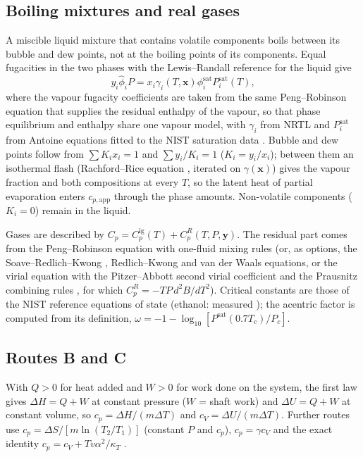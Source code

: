 \documentclass[journal=jceaax,manuscript=article,layout=twocolumn]{achemso}
\begin{document}
\subsection{Boiling mixtures and real gases}
A miscible liquid mixture that contains volatile components boils between its bubble and dew points, not at
the boiling points of its components. Equal fugacities in the two phases with the Lewis--Randall reference
for the liquid give
\begin{equation}
y_i\hat\phi_iP=x_i\gamma_i(T,\mathbf{x})\phi_i^\mathrm{sat}P_i^\mathrm{sat}(T),
\end{equation}
where the vapour fugacity coefficients are taken from the same Peng--Robinson equation that supplies the residual
enthalpy of the vapour, so that phase equilibrium and enthalpy share one vapour model,
with $\gamma_i$ from NRTL and $P_i^\mathrm{sat}$ from Antoine equations fitted to the NIST saturation
data \cite{NISTFluid}. Bubble and dew points follow from $\sum K_ix_i=1$ and $\sum y_i/K_i=1$
($K_i=y_i/x_i$); between them an isothermal flash (Rachford--Rice equation \cite{Rachford1952}, iterated on
$\gamma(\mathbf{x})$) gives the vapour fraction and both compositions at every $T$, so the latent heat of
partial evaporation enters $c_{p,\mathrm{app}}$ through the phase amounts. Non-volatile components
($K_i=0$) remain in the liquid.

Gases are described by $C_p=C_p^\mathrm{ig}(T)+C_p^R(T,P,\mathbf{y})$. The residual part comes from the
Peng--Robinson equation \cite{Peng1976} with one-fluid mixing rules (or, as options, the
Soave--Redlich--Kwong \cite{Soave1972}, Redlich--Kwong and van der Waals equations, or the virial equation
with the Pitzer--Abbott second virial coefficient and the Prausnitz combining rules \cite{Smith2018}, for which
$C_p^R=-TP\,d^2B/dT^2$). Critical constants are those of the NIST reference equations of state (ethanol:
measured \cite{He2018}); the acentric factor is computed from its definition,
$\omega=-1-\log_{10}[P^\mathrm{sat}(0.7T_c)/P_c]$.

\subsection{Routes B and C}
With $Q>0$ for heat added and $W>0$ for work done on the system, the first law gives $\Delta H = Q + W$ at
constant pressure ($W$ = shaft work) and $\Delta U = Q + W$ at constant volume, so
$c_p=\Delta H/(m\Delta T)$ and $c_V=\Delta U/(m\Delta T)$. Further routes use $c_p=\Delta S/[m\ln(T_2/T_1)]$ (constant
$P$ and $c_p$), $c_p=\gamma c_V$ and the exact identity $c_p=c_V+Tv\alpha^2/\kappa_T$ \cite{Smith2018}.
\end{document}
